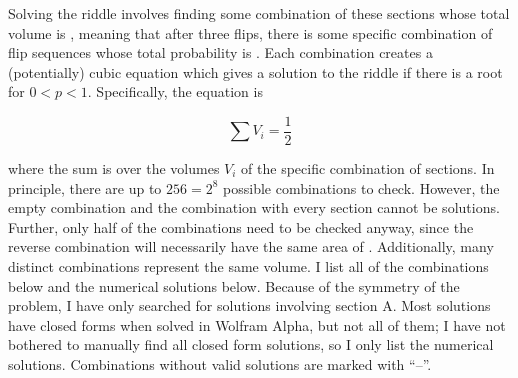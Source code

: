 \documentclass{article}
\begin{document}
Solving the riddle involves finding some combination of these sections whose total volume is , meaning that after three flips, there is some specific combination of flip sequences whose total probability is .
Each combination creates a (potentially) cubic equation which gives a solution to the riddle if there is a root for $0<p<1$.
Specifically, the equation is 

\[
\sum V_{i}=\frac{1}{2}
\]

where the sum is over the volumes $V_{i}$ of the specific combination of sections.
In principle, there are up to $256=2^{8}$ possible combinations to check.
However, the empty combination and the combination with every section cannot be solutions.
Further, only half of the combinations need to be checked anyway, since the reverse combination will necessarily have the same area of .
Additionally, many distinct combinations represent the same volume.
I list all of the combinations below and the numerical solutions below.
Because of the symmetry of the problem, I have only searched for solutions involving section A.
Most solutions have closed forms when solved in Wolfram Alpha, but not all of them; I have not bothered to manually find all closed form solutions, so I only list the numerical solutions.
Combinations without valid solutions are marked with ``--''.
\end{document}
